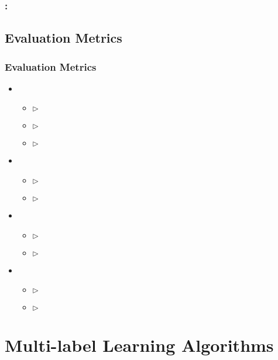 \documentclass{beamer}
\begin{document}
\begin{frame}
\frametitle{\insertsection : \insertsubsection}
\end{frame}

\subsection{Evaluation Metrics} %

\begin{frame}
\frametitle{Evaluation Metrics}
\begin{itemize}
\item 

\begin{itemize}
\item [] $\rhd$ 
\item [] $\rhd$ 
\item [] $\rhd$ 
\end{itemize}

\item 

\begin{itemize}
\item [] $\rhd$ 
\item [] $\rhd$ 
\end{itemize}

\item 
\begin{itemize}
\item [] $\rhd$ 
\item [] $\rhd$
\end{itemize}

\item 
\begin{itemize}
\item [] $\rhd$ 
\item [] $\rhd$
\end{itemize}
\end{itemize}

\end{frame}



\section{Multi-label Learning Algorithms}
\end{document}
